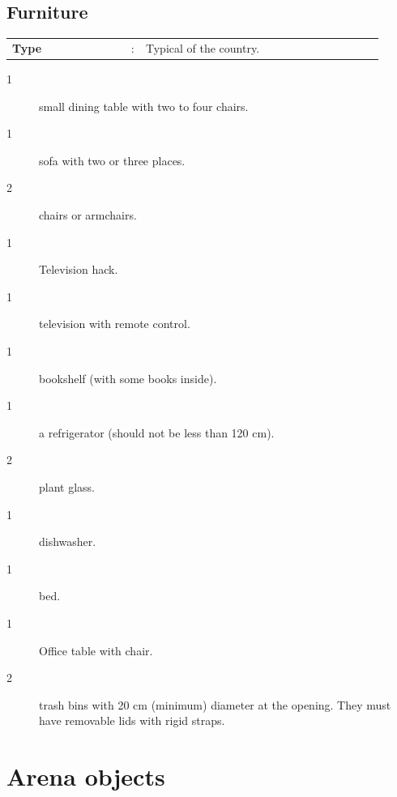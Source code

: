 \documentclass[11pt, twoside, openright, a4paper, chapterprefix]{article}
\begin{document}
\subsection{Furniture}

\begin{tabular}{ p{0.3\linewidth} p{0.01\linewidth} p{0.6\linewidth}}
    \textbf{Type}       & : & Typical of the country. \\
\end{tabular}

\begin{description}
    \item [1] small dining table with two to four chairs.
    \item [1] sofa with two or three places.
    \item [2] chairs or armchairs.
    \item [1] Television hack.
    \item [1] television with remote control.
    \item [1] bookshelf (with some books inside).
    \item [1] a refrigerator (should not be less than 120 cm).
    \item [2] plant glass.
    \item [1] dishwasher.
    \item [1] bed.
    \item [1] Office table with chair.
    \item [2] trash bins with 20 cm (minimum) diameter at the opening. They must have removable lids with rigid straps.
\end{description}

\section{Arena objects}
\end{document}
